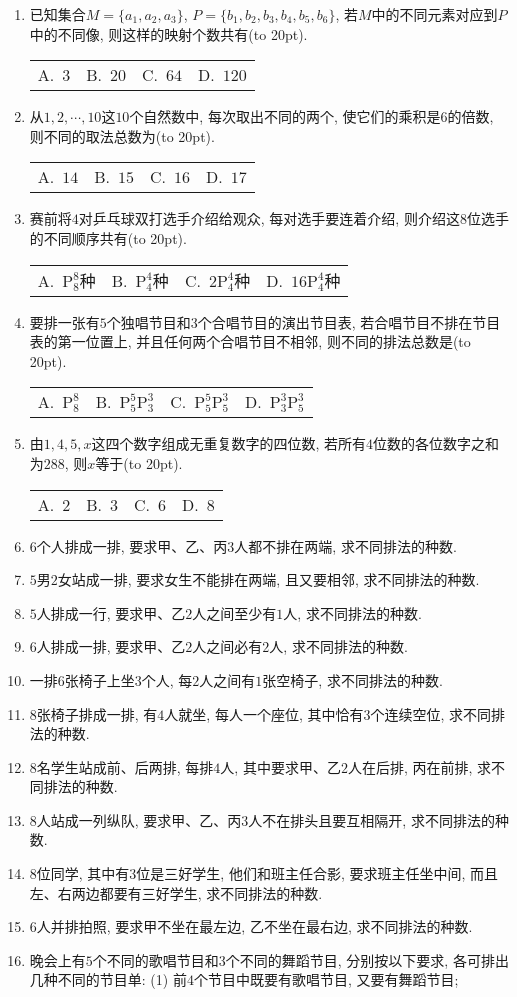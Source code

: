 \documentclass[10pt,a4paper]{article}
\newcommand{\bracket}[1]{(\hbox to #1pt{})}
\newcommand{\fourch}[4]{\par\begin{tabular}{p{.23\textwidth}p{.23\textwidth}p{.23\textwidth}p{.23\textwidth}}
A.~#1 &B.~#2& C.~#3& D.~#4
\end{tabular}}
\begin{document}
\begin{enumerate}[1.]
\fourch{$30$条}{$23$条}{$22$条}{$14$条}
\item 已知集合$M=\{a_1,a_2,a_3\}$, $P=\{b_1,b_2,b_3,b_4,b_5,b_6\}$, 若$M$中的不同元素对应到$P$中的不同像, 则这样的映射个数共有\bracket{20}.
\fourch{$3$}{$20$}{$64$}{$120$}
\item 从$1, 2, \cdots, 10$这$10$个自然数中, 每次取出不同的两个, 使它们的乘积是6的倍数, 则不同的取法总数为\bracket{20}.
\fourch{$14$}{$15$}{$16$}{$17$}
\item 赛前将$4$对乒乓球双打选手介绍给观众, 每对选手要连着介绍, 则介绍这$8$位选手的不同顺序共有\bracket{20}.
\fourch{$\mathrm{P}_8^8$种}{$\mathrm{P}_4^4$种}{$2\mathrm{P}_4^4$种}{$16\mathrm{P}_4^4$种}
\item 要排一张有$5$个独唱节目和$3$个合唱节目的演出节目表, 若合唱节目不排在节目表的第一位置上, 并且任何两个合唱节目不相邻, 则不同的排法总数是\bracket{20}.
\fourch{$\mathrm{P}_8^8$}{$\mathrm{P}_5^5\mathrm{P}_3^3$}{$\mathrm{P}_5^5\mathrm{P}_5^3$}{$\mathrm{P}_3^3\mathrm{P}_5^3$}
\item 由$1, 4, 5,x$这四个数字组成无重复数字的四位数, 若所有$4$位数的各位数字之和为$288$, 则$x$等于\bracket{20}.
\fourch{$2$}{$3$}{$6$}{$8$}
\item $6$个人排成一排, 要求甲、乙、丙$3$人都不排在两端, 求不同排法的种数.
\item $5$男$2$女站成一排, 要求女生不能排在两端, 且又要相邻, 求不同排法的种数.
\item $5$人排成一行, 要求甲、乙$2$人之间至少有$1$人, 求不同排法的种数.
\item $6$人排成一排, 要求甲、乙$2$人之间必有$2$人, 求不同排法的种数.
\item 一排$6$张椅子上坐$3$个人, 每$2$人之间有$1$张空椅子, 求不同排法的种数.
\item $8$张椅子排成一排, 有$4$人就坐, 每人一个座位, 其中恰有$3$个连续空位, 求不同排法的种数.
\item $8$名学生站成前、后两排, 每排$4$人, 其中要求甲、乙$2$人在后排, 丙在前排, 求不同排法的种数.
\item $8$人站成一列纵队, 要求甲、乙、丙$3$人不在排头且要互相隔开, 求不同排法的种数.
\item $8$位同学, 其中有$3$位是三好学生, 他们和班主任合影, 要求班主任坐中间, 而且左、右两边都要有三好学生, 求不同排法的种数.
\item $6$人并排拍照, 要求甲不坐在最左边, 乙不坐在最右边, 求不同排法的种数.
\item 晚会上有$5$个不同的歌唱节目和$3$个不同的舞蹈节目, 分别按以下要求, 各可排出几种不同的节目单:
(1) 前$4$个节目中既要有歌唱节目, 又要有舞蹈节目;\\

\end{enumerate}
\end{document}
